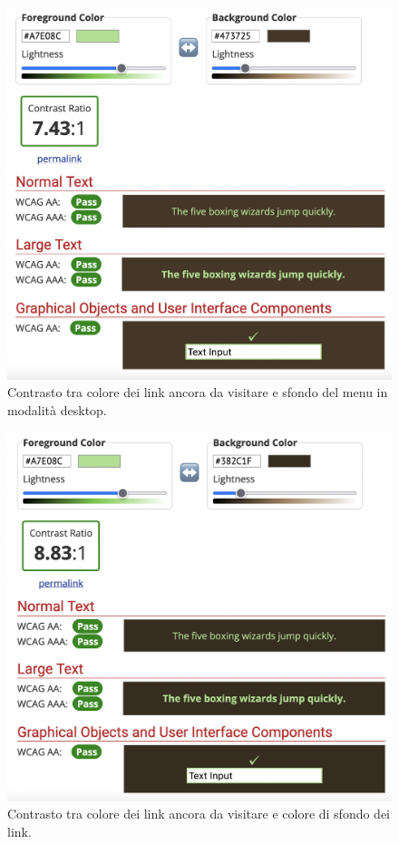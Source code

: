 \documentclass[a4paper]{article}
\begin{document}
	\begin{figure}[H]
		\centering
		\includegraphics[scale=0.3]{immagini/controllo-colori/dark-mode/link-da-visitare_background-menu.png}
		\caption{Contrasto tra colore dei link ancora da visitare e sfondo del menu in modalità desktop.}
	\end{figure}

	\begin{figure}[H]
		\centering
		\includegraphics[scale=0.3]{immagini/controllo-colori/dark-mode/link-da-visitare_sfondo-article-p.png}
		\caption{Contrasto tra colore dei link ancora da visitare e colore di sfondo dei link.}
	\end{figure}
\end{document}
